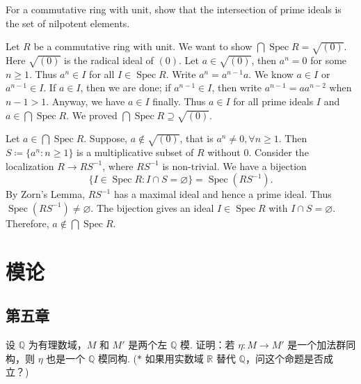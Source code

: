 \setcounter{pb}{28}

\begin{problem}
    For a commutative ring with unit, show that the intersection of prime ideals is the set of nilpotent elements.
\end{problem}

\begin{solution}
    Let $R$ be a commutative ring with unit. We want to show $\bigcap \operatorname{Spec}R=\sqrt{(0)}$. Here $\sqrt{(0)}$ is the radical ideal of $(0)$. 
    Let $ a\in\sqrt{(0)}$, then $a^{n}=0$ for some $n\geq1$. Thus $ a^{n}\in I $ for all $I\in \operatorname{Spec}R$. 
    Write $a^{n}=a^{n-1}a$. We know $a\in I$ or $a^{n-1}\in I$. If $a\in I$, then we are done; if $a^{n-1}\in I$, then write $a^{n-1}=a a^{n-2}$ when $n-1>1$. 
    Anyway, we have $a\in I$ finally. Thus $ a\in I$ for all prime ideals $I$ and $a\in\bigcap \operatorname{Spec}R$. We proved $\bigcap \operatorname{Spec}R\supseteq \sqrt{(0)}$. 
    \par Let $ a\in \bigcap \operatorname{Spec}R $. Suppose, $a\notin\sqrt{(0)}$, that is $a^{n}\ne0, \forall n\geq1$. Then $S \coloneqq \{a^{n}:n\geq1\}$ 
    is a multiplicative subset of $R$ without $0$. Consider the localization $R\to RS^{-1}$, where $R S^{-1}$ is non-trivial. 
    We have a bijection 
        \[
            \{I\in \operatorname{Spec}R: I\cap S=\varnothing\}=\operatorname{Spec}(R S^{-1}).
        \]
    By Zorn's Lemma, $R S^{-1}$ has a maximal ideal and hence a prime ideal. Thus $\operatorname{Spec}(R S^{-1})\ne\varnothing$. 
    The bijection gives an ideal $I\in \operatorname{Spec}R$ with $I\cap S=\varnothing$. Therefore, $a\notin\bigcap \operatorname{Spec}R$. 
\end{solution}

\section{模论}
\subsection{第五章}
\setcounter{pb}{4}
\begin{problem}
    设 $ \mathbb{Q} $ 为有理数域，$ M $ 和 $ M' $ 是两个左 $ \mathbb{Q} $ 模. 证明：若 $ \eta : M \to M' $ 是一个加法群同构，则 $ \eta $ 也是一个 $ \mathbb{Q} $ 模同构. 
    ($*$ 如果用实数域 $ \mathbb{R} $ 替代 $ \mathbb{Q} $，问这个命题是否成立？)
\end{problem}

